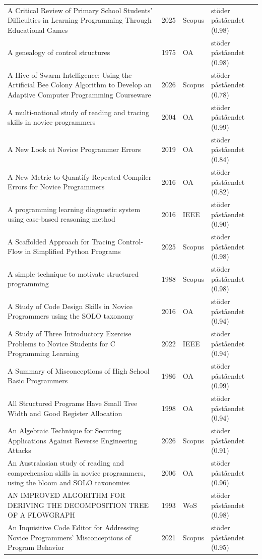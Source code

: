 \begin{longtable}{@{}%
  >{\raggedright\arraybackslash}p{}c%
  >{\raggedright\arraybackslash}p{}%
  >{\raggedright\arraybackslash}p{}@{}}
A Critical Review of Primary School Students' Difficulties in Learning Programming Through Educational Games & 2025 & Scopus & stöder påståendet (0.98) \\
A genealogy of control structures & 1975 & OA & stöder påståendet (0.98) \\
A Hive of Swarm Intelligence: Using the Artificial Bee Colony Algorithm to Develop an Adaptive Computer Programming Courseware & 2026 & Scopus & stöder påståendet (0.78) \\
A multi-national study of reading and tracing skills in novice programmers & 2004 & OA & stöder påståendet (0.99) \\
A New Look at Novice Programmer Errors & 2019 & OA & stöder påståendet (0.84) \\
A New Metric to Quantify Repeated Compiler Errors for Novice Programmers & 2016 & OA & stöder påståendet (0.82) \\
A programming learning diagnostic system using case-based reasoning method & 2016 & IEEE & stöder påståendet (0.90) \\
A Scaffolded Approach for Tracing Control-Flow in Simplified Python Programs & 2025 & Scopus & stöder påståendet (0.98) \\
A simple technique to motivate structured programming & 1988 & Scopus & stöder påståendet (0.98) \\
A Study of Code Design Skills in Novice Programmers using the SOLO taxonomy & 2016 & OA & stöder påståendet (0.94) \\
A Study of Three Introductory Exercise Problems to Novice Students for C Programming Learning & 2022 & IEEE & stöder påståendet (0.94) \\
A Summary of Misconceptions of High School Basic Programmers & 1986 & OA & stöder påståendet (0.99) \\
All Structured Programs Have Small Tree Width and Good Register Allocation & 1998 & OA & stöder påståendet (0.94) \\
An Algebraic Technique for Securing Applications Against Reverse Engineering Attacks & 2026 & Scopus & stöder påståendet (0.91) \\
An Australasian study of reading and comprehension skills in novice programmers, using the bloom and SOLO taxonomies & 2006 & OA & stöder påståendet (0.96) \\
AN IMPROVED ALGORITHM FOR DERIVING THE DECOMPOSITION TREE OF A FLOWGRAPH & 1993 & WoS & stöder påståendet (0.98) \\
An Inquisitive Code Editor for Addressing Novice Programmers' Misconceptions of Program Behavior & 2021 & Scopus & stöder påståendet (0.95) \\

\end{longtable}
